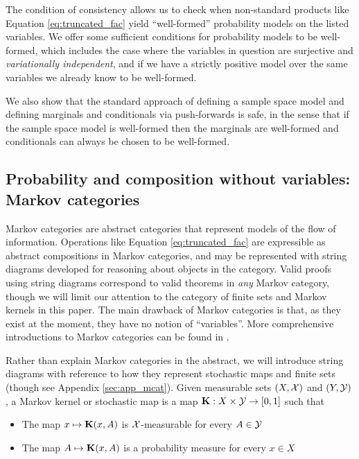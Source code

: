 The condition of consistency allows us to check when non-standard products like Equation \ref{eq:truncated_fac} yield ``well-formed'' probability models on the listed variables. We offer some sufficient conditions for probability models to be well-formed, which includes the case where the variables in question are surjective and \emph{variationally independent}, and if we have a strictly positive model over the same variables we already know to be well-formed.

We also show that the standard approach of defining a sample space model and defining marginals and conditionals via push-forwards is safe, in the sense that if the sample space model is well-formed then the marginals are well-formed and conditionals can always be chosen to be well-formed.

\subsection{Probability and composition without variables: Markov categories}
Markov categories are abstract categories that represent models of the flow of information. Operations like Equation \ref{eq:truncated_fac} are expressible as abstract compositions in Markov categories, and may be represented with string diagrams developed for reasoning about objects in the category. Valid proofs using string diagrams correspond to valid theorems in \emph{any} Markov category, though we will limit our attention to the category of finite sets and Markov kernels in this paper. The main drawback of Markov categories is that, as they exist at the moment, they have no notion of ``variables''. More comprehensive introductions to Markov categories can be found in \citet{fritz_synthetic_2020,cho_disintegration_2019}.

Rather than explain Markov categories in the abstract, we will introduce string diagrams with reference to how they represent stochastic maps and finite sets (though see Appendix \ref{sec:app_mcat}). Given measurable sets $(X,\mathcal{X})$ and $(Y,\mathcal{Y})$, a Markov kernel or stochastic map is a map $\mathbf{K}:X\times \mathcal{Y}\to [0,1]$ such that

\begin{itemize}
	\item The map $x\mapsto \mathbf{K}(x,A)$ is $\mathcal{X}$-measurable for every $A\in \mathcal{Y}$
	\item The map $A\mapsto \mathbf{K}(x,A)$ is a probability measure for every $x\in X$
\end{itemize}

